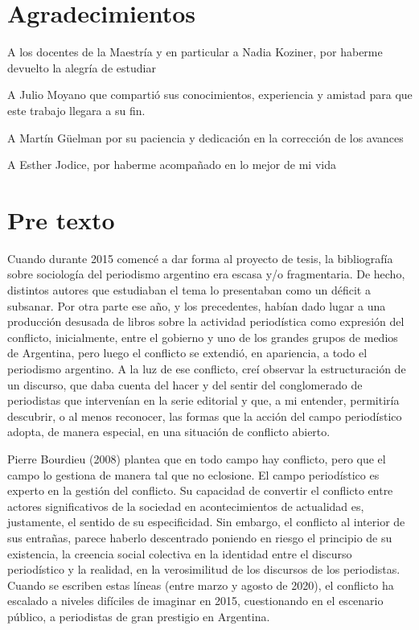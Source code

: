 \section{Agradecimientos}

A los docentes de la Maestría y en particular a Nadia Koziner, por haberme devuelto la alegría de estudiar

A Julio Moyano que compartió sus conocimientos, experiencia y amistad para que este trabajo llegara a su fin.

A Martín Güelman por su paciencia y dedicación en la corrección de los avances

A Esther Jodice, por haberme acompañado en lo mejor de mi vida

\section{Pre texto}

Cuando durante 2015 comencé a dar forma al proyecto de tesis, la bibliografía sobre sociología del periodismo argentino era escasa y/o fragmentaria. De hecho, distintos autores que estudiaban el tema lo presentaban como un déficit a subsanar. Por otra parte ese año, y los precedentes, habían dado lugar a una producción desusada de libros sobre la actividad periodística como expresión del conflicto, inicialmente, entre el gobierno y uno de los grandes grupos de medios de Argentina, pero luego el conflicto se extendió, en apariencia, a todo el periodismo argentino. A la luz de ese conflicto, creí observar la estructuración de un discurso, que daba cuenta del hacer y del sentir del conglomerado de periodistas que intervenían en la serie editorial y que, a mi entender, permitiría descubrir, o al menos reconocer, las formas que la acción del campo periodístico adopta, de manera especial, en una situación de conflicto abierto.

Pierre Bourdieu (2008) plantea que en todo campo hay conflicto, pero que el campo lo gestiona de manera tal que no eclosione. El campo periodístico es experto en la gestión del conflicto. Su capacidad de convertir el conflicto entre actores significativos de la sociedad en acontecimientos de actualidad es, justamente, el sentido de su especificidad. Sin embargo, el conflicto al interior de sus entrañas, parece haberlo descentrado poniendo en riesgo el principio de su existencia, la creencia social colectiva en la identidad entre el discurso periodístico y la realidad, en la verosimilitud de los discursos de los periodistas. Cuando se escriben estas líneas (entre marzo y agosto de 2020), el conflicto ha escalado a niveles difíciles de imaginar en 2015, cuestionando en el escenario público, a periodistas de gran prestigio en Argentina.

